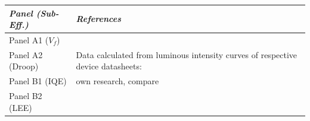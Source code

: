 \documentclass[10pt]{article}
\begin{document}
\begin{table}[h!]
    \begin{tabularx}{\textwidth}{|l|X|}
    \hline
    \textit{Panel (Sub-Eff.)} & \textit{References} \\
    \hline
    Panel A1 ($V_f$) & \cite{nichia2001data}\cite{lumi2002data}\cite{gen2005data}\cite{candlepwr2005data}\cite{lumi2006data}\cite{lumi2007data}\cite{nichia2008data}\cite{lumi2008data}\cite{osram2008data}\cite{jeong2011high}\cite{osram2012data}\cite{osram2013data}\cite{osram2014data} \newline \cite{lumi2016data_1}\cite{lumi2016data_2}\cite{epistar2017data}\cite{osram2017data_1}\cite{osram2017data_2}\cite{samsung2017data}\cite{samsung2018data}\cite{osram2018data}\cite{epistar2018data}\cite{lumi2019data} \\
    \hline
    Panel A2 (Droop) & Data calculated from luminous intensity curves of respective device datasheets: \cite{datasheet_osram_topled}\cite{osram2008data}\cite{osram2008gdplus}\cite{osram2018csp}\cite{datasheet_lumileds_lux1}\cite{lumi2008data}\cite{lumi2016data_1}\cite{lumi2016data_2}\cite{samsung2018data} \\
    \hline
    Panel B1 (IQE) & own research, compare \cite{zenodo_weinold_led_history} \newline
\cite{doe_ssl_multiyear_2006}\cite{doe_ssl_multiyear_2007}\cite{doe_ssl_multiyear_2008}\cite{doe_ssl_multiyear_2009}\cite{doe_ssl_multiyear_2010}\cite{doe_ssl_multiyear_2011}\cite{doe_ssl_multiyear_2012}\cite{doe_ssl_multiyear_2013}\cite{doe_ssl_multiyear_2014}\cite{doe_ssl_rnd_2015}\cite{doe_ssl_rnd_2016} \\
    \hline
    Panel B2 (LEE) & \cite{lee2005analysis}\cite{krames2007status}\cite{Jang2004}\cite{Horng2013}\cite{Liao2010}\cite{HungWenHuang2005}\cite{Leem2007}\cite{Huang2008}\cite{Wang2009}\cite{Huh2003}\cite{Horng2008}\cite{Gao2008}\cite{Chang2003}\cite{Zhou2012} \newline \cite{ChunJuTun2006}\cite{Hua2009}\cite{Matioli2010}
\cite{lee2005analysis}\cite{Zhu2015}\cite{Ding2015}\cite{Taki2019}\cite{Shchekin2006}\cite{Hu2016}\cite{Horng2010}\cite{Lin2016}\cite{Yue2018}\cite{Zhao2012}\cite{Zhu2015}\newline \cite{Ding2015}\cite{wierer2001high}\cite{Steigerwald2002}\cite{DaeSeobHan2006}\cite{Wang2006}\cite{Lee2007}\cite{Shen2007}\cite{Huang2006}\cite{Zhmakin2011} \\
    \hline
    \end{tabularx}
\end{table}

\newpage


\end{document}
